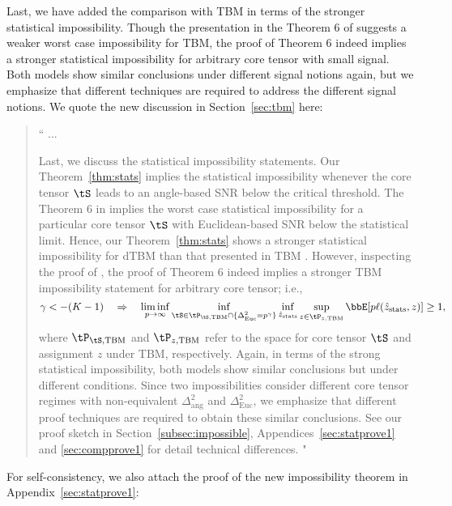 \documentclass[11pt]{article}
\theoremstyle{definition}
\theoremstyle{definition}
\begin{document}
\begin{enumerate}
\begin{enumerate}[wide]
    Last, we have added the comparison with TBM in terms of the stronger statistical impossibility. Though the presentation in the Theorem 6 of \cite{han2020exact} suggests a weaker worst case impossibility for TBM, the proof of Theorem 6 indeed implies a stronger statistical impossibility for arbitrary core tensor with small signal. Both models show similar conclusions under different signal notions again, but we emphasize that different techniques are required to address the different signal notions. We quote the new discussion in Section~\ref{sec:tbm} here:
    
    \begin{quote}
        `` ...
        
         Last, we discuss the statistical impossibility statements. Our Theorem~\ref{thm:stats} implies the statistical impossibility whenever the core tensor $\tS$ leads to an angle-based SNR below the critical threshold. The Theorem 6 in \cite{han2020exact} implies the worst case statistical impossibility for a particular core tensor $\tS$ with Euclidean-based SNR below the statistical limit. Hence, our Theorem~\ref{thm:stats} shows a stronger statistical impossibility for dTBM than that presented in TBM \citet[Theorem 6]{han2020exact}. However, inspecting the proof of \cite{han2020exact}, the proof of Theorem 6 indeed implies a stronger TBM impossibility statement for arbitrary core tensor; i.e.,
 \begin{equation}
     \gamma < -(K-1) \quad \Rightarrow \quad \liminf_{p \rightarrow \infty} \inf_{ \tS \in \tP_{\tS, {\rm TBM}} \cap \{\Delta_{\rm Euc}^2 = p^{\gamma} \} }\inf_{\hat z_{\rm stats}}  \sup_{z \in \tP_{z, {\rm TBM}}}  \bbE[p \ell(\hat z_{\rm stats}, z)] \geq 1,
 \end{equation}
 where $\tP_{\tS, {\rm TBM}}$ and $\tP_{z, {\rm TBM}}$ refer to the space for core tensor $\tS$ and assignment $z$ under TBM, respectively. Again, in terms of the strong statistical impossibility, both models show similar conclusions but under different conditions. Since two impossibilities consider different core tensor regimes with non-equivalent $\Delta^2_{\text{ang}}$ and $\Delta^2_{\text{Euc}}$, we emphasize that different proof techniques are required to obtain these similar conclusions.  See our proof sketch in Section~\ref{subsec:impossible}, Appendices~\ref{sec:statprove1} and \ref{sec:compprove1} for detail technical differences. "
    \end{quote}
    
    For self-consistency, we also attach the proof of the new impossibility theorem in Appendix~\ref{sec:statprove1}:
    

\end{enumerate}
\end{enumerate}
\end{document}
